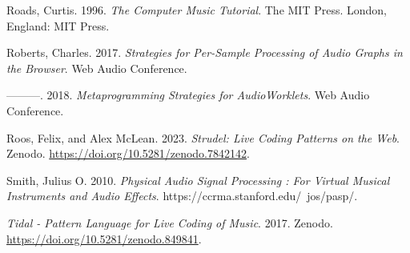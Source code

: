 \documentclass[11pt,]{article}
\newlength{\cslhangindent}
\newenvironment{CSLReferences}[2] %
 {\begin{list}{}{%
  \setlength{\itemindent}{0pt}
  \setlength{\leftmargin}{0pt}
  \setlength{\parsep}{0pt}
  \ifodd #1
   \setlength{\leftmargin}{\cslhangindent}
   \setlength{\itemindent}{-1\cslhangindent}
  \fi
  \setlength{\itemsep}{#2\baselineskip}}}
 {\end{list}}
\begin{document}
\begin{CSLReferences}{1}{0}
Roads, Curtis. 1996. \emph{The Computer Music Tutorial}. The MIT Press.
London, England: MIT Press.

Roberts, Charles. 2017. \emph{Strategies for Per-Sample Processing of
Audio Graphs in the Browser}. Web Audio Conference.

---------. 2018. \emph{Metaprogramming Strategies for AudioWorklets}.
Web Audio Conference.

Roos, Felix, and Alex McLean. 2023. \emph{Strudel: Live Coding Patterns
on the Web}. Zenodo. \url{https://doi.org/10.5281/zenodo.7842142}.

Smith, Julius O. 2010. \emph{Physical Audio Signal Processing : For
Virtual Musical Instruments and Audio Effects}.
https://ccrma.stanford.edu/~jos/pasp/.

\emph{Tidal - Pattern Language for Live Coding of Music}. 2017. Zenodo.
\url{https://doi.org/10.5281/zenodo.849841}.

\end{CSLReferences}
\end{document}

